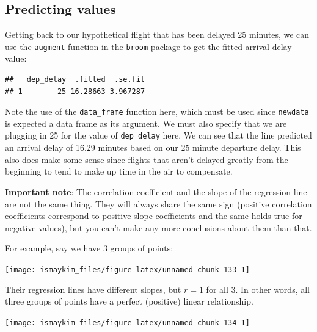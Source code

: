 \documentclass[]{tufte-book}
\newenvironment{Shaded}{\begin{snugshade}}{\end{snugshade}}
\newcommand{\KeywordTok}[1]{\textcolor[rgb]{0.13,0.29,0.53}{\textbf{{#1}}}}
\newcommand{\DataTypeTok}[1]{\textcolor[rgb]{0.13,0.29,0.53}{{#1}}}
\newcommand{\DecValTok}[1]{\textcolor[rgb]{0.00,0.00,0.81}{{#1}}}
\newcommand{\StringTok}[1]{\textcolor[rgb]{0.31,0.60,0.02}{{#1}}}
\newcommand{\NormalTok}[1]{{#1}}
\begin{document}
\subsection{Predicting values}\label{predicting-values}

Getting back to our hypothetical flight that has been delayed 25
minutes, we can use the \texttt{augment} function in the \texttt{broom}
package to get the fitted arrival delay value:

\begin{Shaded}
\end{Shaded}

\begin{verbatim}
##   dep_delay  .fitted  .se.fit
## 1        25 16.28663 3.967287
\end{verbatim}

Note the use of the \texttt{data\_frame} function here, which must be
used since \texttt{newdata} is expected a data frame as its argument. We
must also specify that we are plugging in 25 for the value of
\texttt{dep\_delay} here. We can see that the line predicted an arrival
delay of 16.29 minutes based on our 25 minute departure delay. This also
does make some sense since flights that aren't delayed greatly from the
beginning to tend to make up time in the air to compensate.

\textbf{Important note}: The correlation coefficient and the slope of
the regression line are not the same thing. They will always share the
same sign (positive correlation coefficients correspond to positive
slope coefficients and the same holds true for negative values), but you
can't make any more conclusions about them than that.

For example, say we have 3 groups of points:

\begin{center}\texttt{[image: ismaykim\_files/figure-latex/unnamed-chunk-133-1]} \end{center}

Their regression lines have different slopes, but \(r = 1\) for all 3.
In other words, all three groups of points have a perfect (positive)
linear relationship.

\begin{center}\texttt{[image: ismaykim\_files/figure-latex/unnamed-chunk-134-1]} \end{center}
\end{document}
